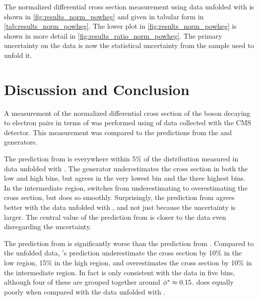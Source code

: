 


The normalized differential cross section measurement using data unfolded with
\POWHEG is shown in \cref{fig:results_norm_powheg} and given in tabular
form in \cref{tab:results_norm_powheg}. The lower plot in
\cref{fig:results_norm_powheg} is shown in more detail in
\cref{fig:results_ratio_norm_powheg}. The primary uncertainty on the data
is now the statistical uncertainty from the \POWHEG sample used to unfold it.




\section{Discussion and Conclusion}
\label{sec:discussion}

A measurement of the normalized differential cross section of the \Z boson
decaying to electron pairs in terms of \phistar was performed using
\GoodLumiNumber of \rootseight data collected with the CMS detector. This
measurement was compared to the predictions from the \MADGRAPH and \POWHEG
generators.

The prediction from \MADGRAPH is everywhere within 5\% of the distribution
measured in data unfolded with \MADGRAPH. The generator underestimates the
cross section in both the low and high \phistar bins, but agrees in the very
lowest bin and the three highest bins. In the intermediate region, \MADGRAPH
switches from underestimating to overestimating the cross section, but does so
smoothly. Surprisingly, the prediction from \MADGRAPH agrees better with the
data unfolded with \POWHEG, and not just because the uncertainty is larger. The
central value of the prediction from \MADGRAPH is closer to the data even
disregarding the uncertainty.

The prediction from \POWHEG is significantly worse than the prediction from
\MADGRAPH. Compared to the \MADGRAPH unfolded data, \POWHEG's prediction
underestimate the cross section by 10\% in the low \phistar region, 15\% in the
high \phistar region, and overestimates the cross section by 10\% in the
intermediate region. In fact \POWHEG is only consistent with the data in five
bins, although four of these are grouped together around $\phi^{*} \approx
0.15$. \POWHEG does equally poorly when compared with the data unfolded with
\POWHEG.


